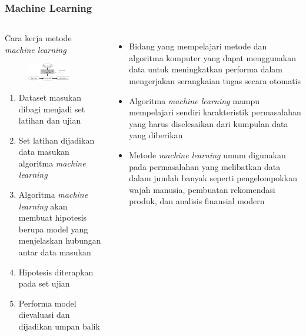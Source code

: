 \documentclass[8pt]{beamer}
\begin{document}
\begin{frame}
  \frametitle{Machine Learning}
  \begin{columns}[c]
    \begin{block}{\center Cara kerja metode \textit{machine learning}}
      \begin{figure}
        \includegraphics[width=0.8\textwidth]{figure/mldiagram.jpg}
      \end{figure}
      \begin{enumerate}
        \item Dataset masukan dibagi menjadi set latihan dan ujian
        \item Set latihan dijadikan data masukan algoritma \textit{machine learning}
        \item Algoritma \textit{machine learning} akan membuat hipotesis berupa model yang menjelaskan hubungan antar data masukan
        \item Hipotesis diterapkan pada set ujian
        \item Performa model dievaluasi dan dijadikan umpan balik
      \end{enumerate}
    \end{block}
    \begin{itemize}
      \item Bidang yang mempelajari metode dan algoritma komputer yang dapat
        menggunakan data untuk meningkatkan performa dalam mengerjakan
        serangkaian tugas secara otomatis \cite{mitchell1997}
      \item Algoritma \textit{machine learning} mampu mempelajari sendiri karakteristik permasalahan yang harus diselesaikan dari kumpulan data yang diberikan
      \item Metode \textit{machine learning} umum digunakan pada permasalahan yang melibatkan data dalam jumlah banyak seperti pengelompokkan wajah manusia, pembuatan rekomendasi produk, dan analisis finansial modern
    \end{itemize}
  \end{columns}
\end{frame}
\end{document}
